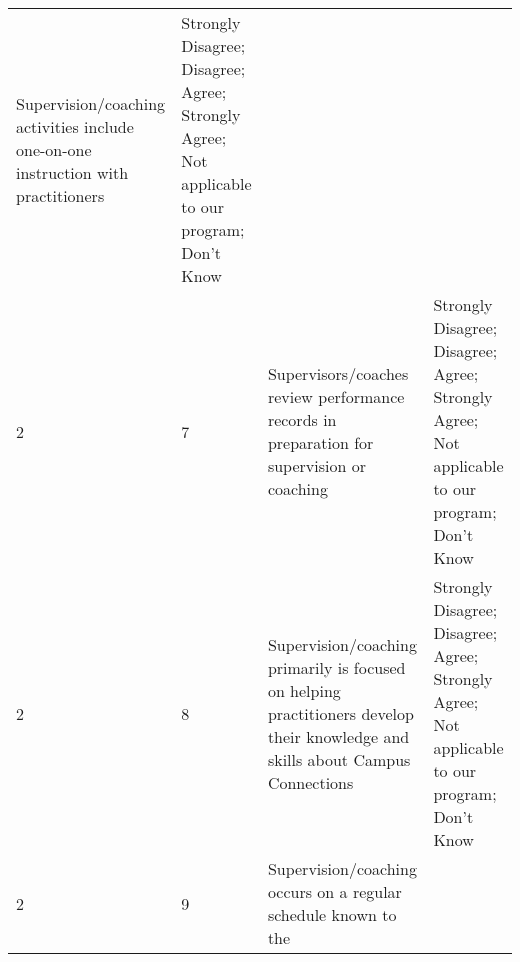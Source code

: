 \documentclass[]{article}
\begin{document}
\begin{longtable}[]{@{}llll@{}}
\begin{minipage}[t]{0.41\columnwidth}
Supervision/coaching activities include one-on-one instruction with
practitioners\strut
\end{minipage} & \begin{minipage}[t]{0.39\columnwidth}\raggedright\strut
Strongly Disagree; Disagree; Agree; Strongly Agree; Not applicable to
our program; Don't Know\strut
\end{minipage}\tabularnewline
\begin{minipage}[t]{0.05\columnwidth}\raggedright\strut
2\strut
\end{minipage} & \begin{minipage}[t]{0.04\columnwidth}\raggedright\strut
7\strut
\end{minipage} & \begin{minipage}[t]{0.41\columnwidth}\raggedright\strut
Supervisors/coaches review performance records in preparation for
supervision or coaching\strut
\end{minipage} & \begin{minipage}[t]{0.39\columnwidth}\raggedright\strut
Strongly Disagree; Disagree; Agree; Strongly Agree; Not applicable to
our program; Don't Know\strut
\end{minipage}\tabularnewline
\begin{minipage}[t]{0.05\columnwidth}\raggedright\strut
2\strut
\end{minipage} & \begin{minipage}[t]{0.04\columnwidth}\raggedright\strut
8\strut
\end{minipage} & \begin{minipage}[t]{0.41\columnwidth}\raggedright\strut
Supervision/coaching primarily is focused on helping practitioners
develop their knowledge and skills about Campus Connections\strut
\end{minipage} & \begin{minipage}[t]{0.39\columnwidth}\raggedright\strut
Strongly Disagree; Disagree; Agree; Strongly Agree; Not applicable to
our program; Don't Know\strut
\end{minipage}\tabularnewline
\begin{minipage}[t]{0.05\columnwidth}\raggedright\strut
2\strut
\end{minipage} & \begin{minipage}[t]{0.04\columnwidth}\raggedright\strut
9\strut
\end{minipage} & \begin{minipage}[t]{0.41\columnwidth}\raggedright\strut
Supervision/coaching occurs on a regular schedule known to the

\end{minipage}
\end{longtable}
\end{document}
